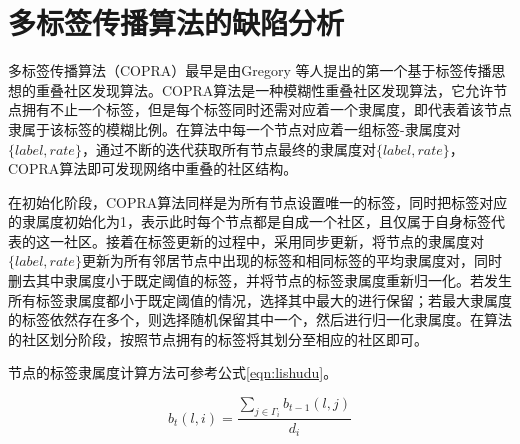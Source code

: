 \section{多标签传播算法的缺陷分析}

多标签传播算法（COPRA）\cite{Gregory2009Finding}最早是由Gregory 等人提出的第一个基于标签传播思想的重叠社区发现算法。COPRA算法是一种模糊性重叠社区发现算法，它允许节点拥有不止一个标签，但是每个标签同时还需对应着一个隶属度，即代表着该节点隶属于该标签的模糊比例。在算法中每一个节点对应着一组标签-隶属度对$ \{ label, rate\} $，通过不断的迭代获取所有节点最终的隶属度对$ \{ label, rate\} $，COPRA算法即可发现网络中重叠的社区结构。

在初始化阶段，COPRA算法同样是为所有节点设置唯一的标签，同时把标签对应的隶属度初始化为1，表示此时每个节点都是自成一个社区，且仅属于自身标签代表的这一社区。接着在标签更新的过程中，采用同步更新，将节点的隶属度对$ \{ label, rate\} $更新为所有邻居节点中出现的标签和相同标签的平均隶属度对，同时删去其中隶属度小于既定阈值的标签，并将节点的标签隶属度重新归一化。若发生所有标签隶属度都小于既定阈值的情况，选择其中最大的进行保留；若最大隶属度的标签依然存在多个，则选择随机保留其中一个，然后进行归一化隶属度。在算法的社区划分阶段，按照节点拥有的标签将其划分至相应的社区即可。

节点的标签隶属度计算方法可参考公式\ref{eqn:lishudu}。

\begin{equation}
  \label{eqn:lishudu}
  b_t(l,i)=\frac{\sum_{j\in \Gamma_i }b_{t-1}(l,j)}{d_i}
\end{equation}

